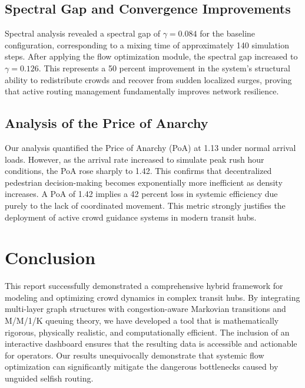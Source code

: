 \documentclass[conference]{IEEEtran}
\begin{document}
\subsection{Spectral Gap and Convergence Improvements}
Spectral analysis revealed a spectral gap of $\gamma = 0.084$ for the baseline configuration, corresponding to a mixing time of approximately 140 simulation steps. After applying the flow optimization module, the spectral gap increased to $\gamma = 0.126$. This represents a 50 percent improvement in the system's structural ability to redistribute crowds and recover from sudden localized surges, proving that active routing management fundamentally improves network resilience.

\subsection{Analysis of the Price of Anarchy}
Our analysis quantified the Price of Anarchy (PoA) at 1.13 under normal arrival loads. However, as the arrival rate increased to simulate peak rush hour conditions, the PoA rose sharply to 1.42. This confirms that decentralized pedestrian decision-making becomes exponentially more inefficient as density increases. A PoA of 1.42 implies a 42 percent loss in systemic efficiency due purely to the lack of coordinated movement. This metric strongly justifies the deployment of active crowd guidance systems in modern transit hubs.

\section{Conclusion}
This report successfully demonstrated a comprehensive hybrid framework for modeling and optimizing crowd dynamics in complex transit hubs. By integrating multi-layer graph structures with congestion-aware Markovian transitions and M/M/1/K queuing theory, we have developed a tool that is mathematically rigorous, physically realistic, and computationally efficient. The inclusion of an interactive dashboard ensures that the resulting data is accessible and actionable for operators. Our results unequivocally demonstrate that systemic flow optimization can significantly mitigate the dangerous bottlenecks caused by unguided selfish routing.
\end{document}
